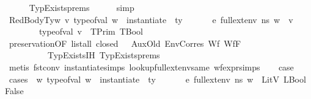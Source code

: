\begin{isabellebody}
\ \ \ \ \isamarkupfalse%
\ TypExists{\isachardot}{\kern0pt}prems{\isacharparenleft}{\kern0pt}{}{\isacharparenright}{\kern0pt}\isanewline
\ \ \ \ \isamarkupfalse%
\ simp\isanewline
\ \ \isamarkupfalse%
\ RedBodyTy{\isacharcolon}{\kern0pt}{\isachardoublequoteopen}{\isasymAnd}w\ v{\isacharprime}{\kern0pt}{\isachardot}{\kern0pt}\ type{\isacharunderscore}{\kern0pt}of{\isacharunderscore}{\kern0pt}val\ w\ {\isacharequal}{\kern0pt}\ instantiate\ {\isasymOmega}\ ty\ {\isasymLongrightarrow}\ \ {\isasymLambda}{\isacharcomma}{\kern0pt}\ {\isasymGamma}{\isacharcomma}{\kern0pt}\ {\isasymOmega}\ {\isasymturnstile}\ {\isasymlangle}e{\isacharcomma}{\kern0pt}\ full{\isacharunderscore}{\kern0pt}ext{\isacharunderscore}{\kern0pt}env\ n{\isacharunderscore}{\kern0pt}s\ w{\isasymrangle}\ {\isasymDown}\ v{\isacharprime}{\kern0pt}\ {\isasymLongrightarrow}\isanewline
\ \ \ \ \ \ \ \ type{\isacharunderscore}{\kern0pt}of{\isacharunderscore}{\kern0pt}val\ v{\isacharprime}{\kern0pt}\ {\isacharequal}{\kern0pt}\ TPrim\ TBool{\isachardoublequoteclose}\isanewline
\ \ \ \ \isamarkupfalse%
\ preservation{\isacharparenleft}{\kern0pt}{}{\isacharparenright}{\kern0pt}{\isacharbrackleft}{\kern0pt}OF\ {\isacartoucheopen}list{\isacharunderscore}{\kern0pt}all\ closed\ {\isasymOmega}{\isacartoucheclose}\ {\isacharunderscore}{\kern0pt}\ AuxOld\ EnvCorres\ Wf{\isacharunderscore}{\kern0pt}{\isasymGamma}\ Wf{\isacharunderscore}{\kern0pt}F{\isacharbrackright}{\kern0pt}\isanewline
\ \ \ \ \ \ \ \ \ \ TypExists{\isachardot}{\kern0pt}IH{\isacharparenleft}{\kern0pt}{}{\isacharparenright}{\kern0pt}\ TypExists{\isachardot}{\kern0pt}prems\ \ \ \ \ \isanewline
\ \ \ \ \isamarkupfalse%
\ {\isacharparenleft}{\kern0pt}metis\ fst{\isacharunderscore}{\kern0pt}conv\ instantiate{\isachardot}{\kern0pt}simps{\isacharparenleft}{\kern0pt}{}{\isacharparenright}{\kern0pt}\ lookup{\isacharunderscore}{\kern0pt}full{\isacharunderscore}{\kern0pt}ext{\isacharunderscore}{\kern0pt}env{\isacharunderscore}{\kern0pt}same\ wf{\isacharunderscore}{\kern0pt}expr{\isachardot}{\kern0pt}simps{\isacharparenleft}{\kern0pt}{}{}{\isacharparenright}{\kern0pt}{\isacharparenright}{\kern0pt}\isanewline
\ \ \isamarkupfalse%
\ {\isacharquery}{\kern0pt}case\isanewline
\ \ \isamarkupfalse%
\ {\isacharparenleft}{\kern0pt}cases\ {\isachardoublequoteopen}{\isasymforall}\ w{\isachardot}{\kern0pt}\ type{\isacharunderscore}{\kern0pt}of{\isacharunderscore}{\kern0pt}val\ w\ {\isacharequal}{\kern0pt}\ instantiate\ {\isasymOmega}\ ty\ {\isasymlongrightarrow}\ \ {\isasymLambda}{\isacharcomma}{\kern0pt}\ {\isasymGamma}{\isacharcomma}{\kern0pt}\ {\isasymOmega}\ {\isasymturnstile}\ {\isasymlangle}e{\isacharcomma}{\kern0pt}\ full{\isacharunderscore}{\kern0pt}ext{\isacharunderscore}{\kern0pt}env\ n{\isacharunderscore}{\kern0pt}s\ w{\isasymrangle}\ {\isasymDown}\ LitV\ {\isacharparenleft}{\kern0pt}LBool\ False{\isacharparenright}{\kern0pt}{\isachardoublequoteclose}{\isacharparenright}{\kern0pt}\isanewline

\end{isabellebody}
